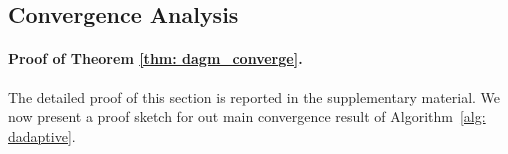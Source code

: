 \documentclass{article} %
\begin{document}



\subsection{Convergence Analysis}
\paragraph{Proof of Theorem \ref{thm: dagm_converge}.} The detailed proof of this section is reported in the supplementary material.
We now present a proof sketch for out main convergence result of Algorithm~\ref{alg: dadaptive}. 
\end{document}
